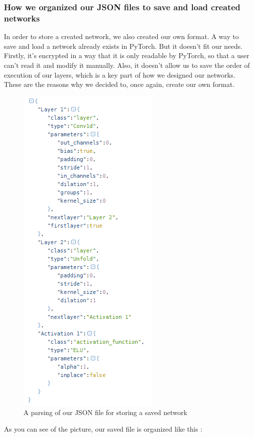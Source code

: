 \subsubsection{How we organized our JSON files to save and load created networks}
In order to store a created network, we also created our own format.
A way to save and load a network already exists in PyTorch. But it doesn't fit our needs. Firstly, it's encrypted in a way that it is only readable by PyTorch, so that a user can't read it and modify it manually. Also, it doesn't allow us to save the order of execution of our layers, which is a key part of how we designed our networks.
These are the reasons why we decided to, once again, create our own format.
\begin{figure}[]
    \centering 
    \includegraphics[scale=0.7]{figures/saved_network.png}
    \caption{A parsing of our JSON file for storing a saved network}
\end{figure}
\newline As you can see of the picture, our saved file is organized like this :
